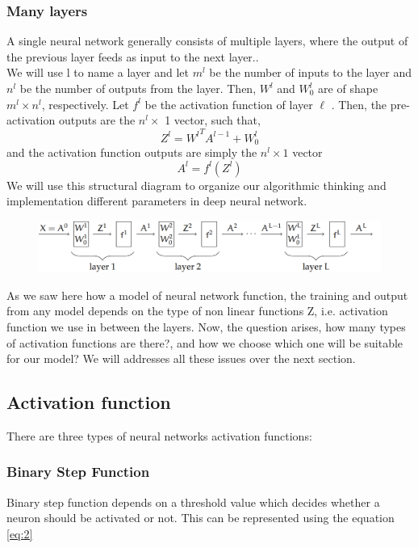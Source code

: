 \subsubsection{Many layers}

A single neural network generally consists of multiple layers, where the output of the previous layer feeds as input to the next layer..\\
 We will use l to name a layer and 
let $m^l$ be the  number of inputs to the layer and $n^l$ be the number of outputs from the layer. Then, $W^l$ and $W^l _0$ are of shape $m^l \times n^l$, respectively. Let $f^l$ be the activation
function of layer  $ \ell$ . Then, the pre-activation outputs are the $n^l \times$ 1 vector, such that,
\begin{equation*}
    Z^l = {W^l}^T A^{l-1} + W_0^l
\end{equation*}
and the activation function outputs are simply the $n^l \times 1$ vector
\begin{equation*}
    A^l = f^l(Z^l)
\end{equation*}
We will use this structural diagram to organize our algorithmic thinking and implementation different parameters in deep neural network.
\begin{figure}[H]
    \centering
    \includegraphics[scale=0.3]{Figures/ml__3.png}
    \label{fig:my_label}
\end{figure}

As we saw here how a model of neural network function, the training and output from any model depends on the type of non linear functions Z, i.e. activation function we use in between the layers. Now, the question arises, how many types of activation functions are there?, and how we choose which one will be suitable for our model? We will addresses all these issues over the next section.

\subsection{ Activation function}
\label{subsection:Activationfunction}
There are three types of neural networks activation functions:
\subsubsection{Binary Step Function}
Binary step function depends on a threshold value which decides whether a neuron should be activated or not. This can be represented using the equation \autoref{eq:2}


